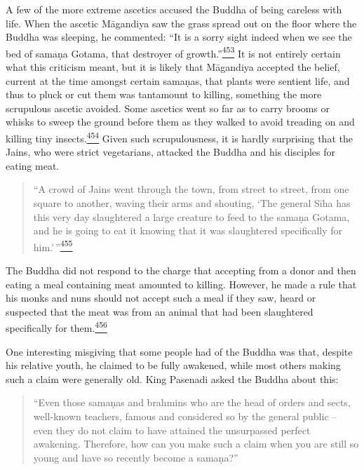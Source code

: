 A few of the more extreme ascetics accused the Buddha of being careless
with life. When the ascetic Māgandiya saw the grass spread out on the
floor where the Buddha was sleeping, he commented: ``It is a sorry sight
indeed when we see the bed of samaṇa Gotama, that destroyer of
growth.''\label{footprints_split_013.html_fnref453}\hyperref[footprints_split_025.htmlux5cux23fn453]{\textsuperscript{453}}
It is not entirely certain what this criticism meant, but it is likely
that Māgandiya accepted the belief, current at the time amongst certain
samaṇas, that plants were sentient life, and thus to pluck or cut them
was tantamount to killing, something the more scrupulous ascetic
avoided. Some ascetics went so far as to carry brooms or whisks to sweep
the ground before them as they walked to avoid treading on and killing
tiny
insects.\label{footprints_split_013.html_fnref454}\hyperref[footprints_split_025.htmlux5cux23fn454]{\textsuperscript{454}}
Given such scrupulousness, it is hardly surprising that the Jains, who
were strict vegetarians, attacked the Buddha and his disciples for
eating meat.

\begin{quote}
``A crowd of Jains went through the town, from street to street, from
one square to another, waving their arms and shouting, `The general Sīha
has this very day slaughtered a large creature to feed to the samaṇa
Gotama, and he is going to eat it knowing that it was slaughtered
specifically for
him.'\,''\label{footprints_split_013.html_fnref455}\hyperref[footprints_split_025.htmlux5cux23fn455]{\textsuperscript{455}}
\end{quote}

The Buddha did not respond to the charge that accepting from a donor and
then eating a meal containing meat amounted to killing. However, he made
a rule that his monks and nuns should not accept such a meal if they
saw, heard or suspected that the meat was from an animal that had been
slaughtered specifically for
them.\label{footprints_split_013.html_fnref456}\hyperref[footprints_split_025.htmlux5cux23fn456]{\textsuperscript{456}}

One interesting misgiving that some people had of the Buddha was that,
despite his relative youth, he claimed to be fully awakened, while most
others making such a claim were generally old. King Pasenadi asked the
Buddha about this:

\begin{quote}
``Even those samaṇas and brahmins who are the head of orders and sects,
well-known teachers, famous and considered so by the general public --
even they do not claim to have attained the unsurpassed perfect
awakening. Therefore, how can you make such a claim when you are still
so young and have so recently become a samaṇa?''
\end{quote}

